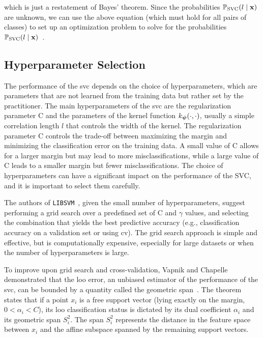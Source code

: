 which is just a restatement of Bayes' theorem. Since the probabilities $\mathbb{P}_{\mathrm{SVC}}(l \mid \mathbf{x})$ are unknown, we can use the above equation (which must hold for all pairs of classes) to set up an optimization problem to solve for the probabilities $\mathbb{P}_{\mathrm{SVC}}(l \mid \mathbf{x})$~\cite{libsvm,wu_2004}.


\subsection{Hyperparameter Selection}
\label{sec:ntools:svm:hyperparameter}

The performance of the \gls{svc} depends on the choice of hyperparameters, which are parameters that are not learned from the training data but rather set by the practitioner. The main hyperparameters of the \gls{svc} are the regularization parameter $\mathrm{C}$ and the parameters of the kernel function $k_{\boldsymbol{\psi}}(\cdot, \cdot)$, usually a simple correlation length $l$ that controls the width of the kernel. The regularization parameter $\mathrm{C}$ controls the trade-off between maximizing the margin and minimizing the classification error on the training data. A small value of $\mathrm{C}$ allows for a larger margin but may lead to more misclassifications, while a large value of $\mathrm{C}$ leads to a smaller margin but fewer misclassifications. The choice of hyperparameters can have a significant impact on the performance of the SVC, and it is important to select them carefully.

\smallskip
The authors of \texttt{LIBSVM}~\cite{libsvm}, given the small number of hyperparameters, suggest performing a grid search over a predefined set of $\mathrm{C}$ and $\gamma$ values, and selecting the combination that yields the best predictive accuracy (e.g., classification accuracy on a validation set or using \gls{cv}). The grid search approach is simple and effective, but is computationally expensive, especially for large datasets or when the number of hyperparameters is large.


\smallskip
To improve upon grid search and cross-validation, Vapnik and Chapelle demonstrated that the \gls{loo} error, an unbiased estimator of the performance of the \gls{svc}, can be bounded by a quantity called the geometric span~\cite{chapelle_2002}. The theorem states that if a point $x_i$ is a free support vector (lying exactly on the margin, $0 < \alpha_i < C$), its \gls{loo} classification status is dictated by its dual coefficient $\alpha_i$ and its geometric span $S_i^2$. The span $S_i^2$ represents the distance in the feature space between $x_i$ and the affine subspace spanned by the remaining support vectors.

